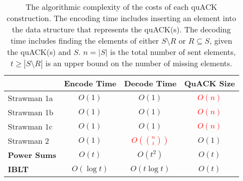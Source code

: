 \begin{table}[t]
\centering
\begin{tabular}{lccc}
  \toprule
  & \bf Encode Time & \bf Decode Time & \bf QuACK Size \\
  \midrule
  Strawman 1a & $O(1)$ & $O(1)$ & \textcolor{red}{$O(n)$} \\
  Strawman 1b & $O(1)$ & $O(1)$ & \textcolor{red}{$O(n)$} \\
  Strawman 1c & $O(1)$ & $O(1)$ & \textcolor{red}{$O(n)$} \\
  Strawman 2 & $O(1)$ & \textcolor{red}{$O(\binom{n}{t})$} & $O(1)$ \\
  \bf \textcolor{black!50!blue}{Power Sums} & \bf \textcolor{black!50!blue}{$O(t)$} & \bf \textcolor{black!50!blue}{$O(t^2)$} & \bf \textcolor{black!50!blue}{$O(t)$} \\
  \bf \textcolor{black!50!blue}{IBLT} & \bf \textcolor{black!50!blue}{$O(\log t)$} & \bf \textcolor{black!50!blue}{$O(t\log t)$} & \bf \textcolor{black!50!blue}{$O(t)$} \\
  \bottomrule
\end{tabular}
\caption{The algorithmic complexity of the costs of each quACK construction.
The encoding time includes inserting an element into the data structure that
represents the quACK(s). The decoding time
 includes finding the elements of either $S \setminus R$ or $R \subseteq S$,
 given the quACK(s) and $S$.
$n = |S|$ is the total number of sent elements, $t \geq |S \setminus R|$ is an
upper bound on the number of missing elements. \\
}
\label{tab:quack:theoretical}
\end{table}
